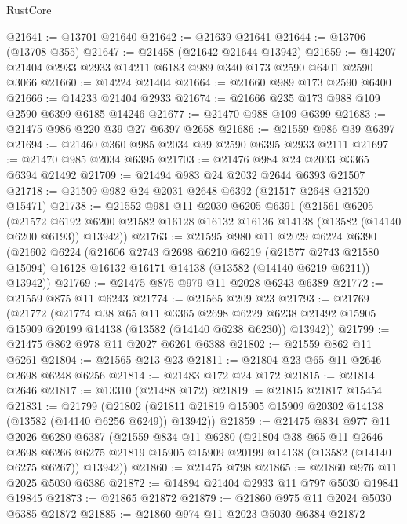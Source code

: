 \begin{lexlean}{RustCore}
\begin{coremodule}
@21641 := @13701 @21640
@21642 := @21639 @21641
@21644 := @13706 (@13708 @355)
@21647 := @21458 (@21642 @21644 @13942)
@21659 := @14207 @21404 @2933 @2933 @14211 @6183 @989 @340 @173 @2590 @6401 @2590 @3066
@21660 := @14224 @21404
@21664 := @21660 @989 @173 @2590 @6400
@21666 := @14233 @21404 @2933
@21674 := @21666 @235 @173 @988 @109 @2590 @6399 @6185 @14246
@21677 := @21470 @988 @109 @6399
@21683 := @21475 @986 @220 @39 @27 @6397 @2658
@21686 := @21559 @986 @39 @6397
@21694 := @21460 @360 @985 @2034 @39 @2590 @6395 @2933 @2111
@21697 := @21470 @985 @2034 @6395
@21703 := @21476 @984 @24 @2033 @3365 @6394 @21492
@21709 := @21494 @983 @24 @2032 @2644 @6393 @21507
@21718 := @21509 @982 @24 @2031 @2648 @6392 (@21517 @2648 @21520 @15471)
@21738 := @21552
    @981
    @11
    @2030
    @6205
    @6391
    (@21561
      @6205
      (@21572 @6192 @6200 @21582 @16128 @16132 @16136 @14138 (@13582 (@14140 @6200 @6193)) @13942))
@21763 := @21595
    @980
    @11
    @2029
    @6224
    @6390
    (@21602
      @6224
      (@21606
        @2743
        @2698
        @6210
        @6219
        (@21577 @2743 @21580 @15094)
        @16128
        @16132
        @16171
        @14138
        (@13582 (@14140 @6219 @6211))
        @13942))
@21769 := @21475 @875 @979 @11 @2028 @6243 @6389
@21772 := @21559 @875 @11 @6243
@21774 := @21565 @209 @23
@21793 := @21769
    (@21772
      (@21774
        @38
        @65
        @11
        @3365
        @2698
        @6229
        @6238
        @21492
        @15905
        @15909
        @20199
        @14138
        (@13582 (@14140 @6238 @6230))
        @13942))
@21799 := @21475 @862 @978 @11 @2027 @6261 @6388
@21802 := @21559 @862 @11 @6261
@21804 := @21565 @213 @23
@21811 := @21804 @23 @65 @11 @2646 @2698 @6248 @6256
@21814 := @21483 @172 @24 @172
@21815 := @21814 @2646
@21817 := @13310 (@21488 @172)
@21819 := @21815 @21817 @15454
@21831 := @21799
    (@21802 (@21811 @21819 @15905 @15909 @20302 @14138 (@13582 (@14140 @6256 @6249)) @13942))
@21859 := @21475
    @834
    @977
    @11
    @2026
    @6280
    @6387
    (@21559
      @834
      @11
      @6280
      (@21804
        @38
        @65
        @11
        @2646
        @2698
        @6266
        @6275
        @21819
        @15905
        @15909
        @20199
        @14138
        (@13582 (@14140 @6275 @6267))
        @13942))
@21860 := @21475 @798
@21865 := @21860 @976 @11 @2025 @5030 @6386
@21872 := @14894 @21404 @2933 @11 @797 @5030 @19841 @19845
@21873 := @21865 @21872
@21879 := @21860 @975 @11 @2024 @5030 @6385 @21872
@21885 := @21860 @974 @11 @2023 @5030 @6384 @21872

\end{coremodule}
\end{lexlean}
